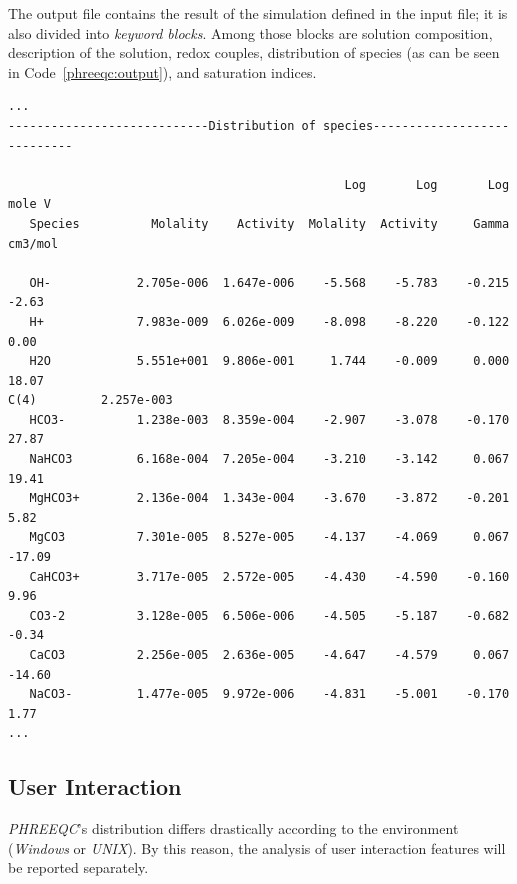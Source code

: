 The output file contains the result of the simulation defined in the input file; it is also divided into \emph{keyword blocks}. Among those blocks are solution composition, description of the solution, redox couples, distribution of species (as can be seen in Code~\ref{phreeqc:output}), and saturation indices.

\begin{minipage}[c]{0.92\textwidth}
\begin{lstlisting}[frame=single, caption=\emph{PHREEQC}'s excerpt from the output file, label=phreeqc:output]
...
----------------------------Distribution of species----------------------------
 
                                               Log       Log       Log    mole V
   Species          Molality    Activity  Molality  Activity     Gamma   cm3/mol
 
   OH-            2.705e-006  1.647e-006    -5.568    -5.783    -0.215     -2.63
   H+             7.983e-009  6.026e-009    -8.098    -8.220    -0.122      0.00
   H2O            5.551e+001  9.806e-001     1.744    -0.009     0.000     18.07
C(4)         2.257e-003
   HCO3-          1.238e-003  8.359e-004    -2.907    -3.078    -0.170     27.87
   NaHCO3         6.168e-004  7.205e-004    -3.210    -3.142     0.067     19.41
   MgHCO3+        2.136e-004  1.343e-004    -3.670    -3.872    -0.201      5.82
   MgCO3          7.301e-005  8.527e-005    -4.137    -4.069     0.067    -17.09
   CaHCO3+        3.717e-005  2.572e-005    -4.430    -4.590    -0.160      9.96
   CO3-2          3.128e-005  6.506e-006    -4.505    -5.187    -0.682     -0.34
   CaCO3          2.256e-005  2.636e-005    -4.647    -4.579     0.067    -14.60
   NaCO3-         1.477e-005  9.972e-006    -4.831    -5.001    -0.170      1.77
...
\end{lstlisting}
\end{minipage}

\subsection{User Interaction}
\emph{PHREEQC}'s distribution differs drastically according to the environment (\emph{Windows} or \emph{UNIX}). By this reason, the analysis of user interaction features will be reported separately.

